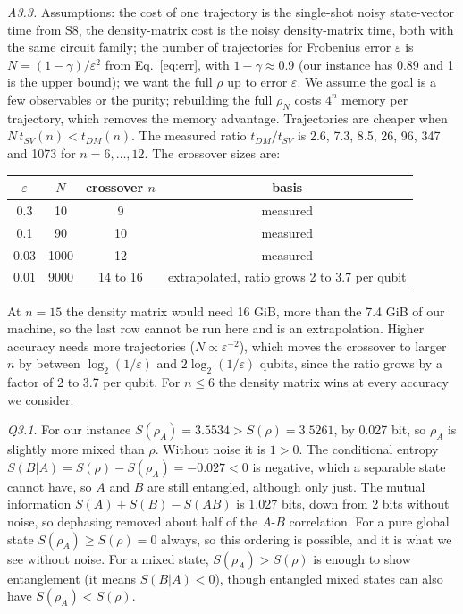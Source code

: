 \documentclass[10pt]{article}
\newcommand{\lab}[1]{\noindent\textit{#1}\;}
\begin{document}
\lab{A3.3.} Assumptions: the cost of one trajectory is the single-shot noisy state-vector time from S8, the density-matrix cost is the noisy density-matrix time, both with the same circuit family; the number of trajectories for Frobenius error $\varepsilon$ is $N=(1-\gamma)/\varepsilon^2$ from Eq.~\eqref{eq:err}, with $1-\gamma\approx0.9$ (our instance has 0.89 and 1 is the upper bound); we want the full $\rho$ up to error $\varepsilon$. We assume the goal is a few observables or the purity; rebuilding the full $\bar\rho_N$ costs $4^n$ memory per trajectory, which removes the memory advantage. Trajectories are cheaper when $N\,t_{SV}(n)<t_{DM}(n)$. The measured ratio $t_{DM}/t_{SV}$ is 2.6, 7.3, 8.5, 26, 96, 347 and 1073 for $n=6,\dots,12$. The crossover sizes are:
\begin{center}\small
\begin{tabular}{cccc}
\toprule
$\varepsilon$ & $N$ & crossover $n$ & basis\\
\midrule
0.3 & 10 & 9 & measured\\
0.1 & 90 & 10 & measured\\
0.03 & 1000 & 12 & measured\\
0.01 & 9000 & 14 to 16 & extrapolated, ratio grows 2 to 3.7 per qubit\\
\bottomrule
\end{tabular}
\end{center}
At $n=15$ the density matrix would need 16 GiB, more than the 7.4 GiB of our machine, so the last row cannot be run here and is an extrapolation. Higher accuracy needs more trajectories ($N\propto\varepsilon^{-2}$), which moves the crossover to larger $n$ by between $\log_2(1/\varepsilon)$ and $2\log_2(1/\varepsilon)$ qubits, since the ratio grows by a factor of 2 to 3.7 per qubit. For $n\le6$ the density matrix wins at every accuracy we consider.

\lab{Q3.1.} For our instance $S(\rho_A)=3.5534>S(\rho)=3.5261$, by 0.027 bit, so $\rho_A$ is slightly more mixed than $\rho$. Without noise it is $1>0$. The conditional entropy $S(B|A)=S(\rho)-S(\rho_A)=-0.027<0$ is negative, which a separable state cannot have, so $A$ and $B$ are still entangled, although only just. The mutual information $S(A)+S(B)-S(AB)$ is 1.027 bits, down from 2 bits without noise, so dephasing removed about half of the $A$-$B$ correlation. For a pure global state $S(\rho_A)\ge S(\rho)=0$ always, so this ordering is possible, and it is what we see without noise. For a mixed state, $S(\rho_A)>S(\rho)$ is enough to show entanglement (it means $S(B|A)<0$), though entangled mixed states can also have $S(\rho_A)<S(\rho)$.
\end{document}
